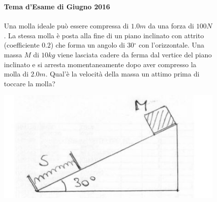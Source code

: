 \begin{figure}[h!]
{{            }
        }                  
    \end{figure}
    
    \begin{figure}[h!]
    \textbf{Tema d'Esame di Giugno 2016}\\ \\
    Una molla ideale può essere compressa di $1.0 m$ da una forza di $100 N$. La stessa molla è posta alla fine di un piano inclinato con attrito (coefficiente $0.2$) che forma un angolo di 30$^{\circ}$ con l'orizzontale. Una massa $M$ di $10 kg$ viene lasciata cadere da ferma dal vertice del piano inclinato e si arresta momentaneamente dopo aver compresso la molla di $2.0 m$. Qual'è la velocità della massa un attimo prima di toccare la molla? 
    \\
        \begin{center}
            \includegraphics[scale=0.5]{ES2/GIU022016.jpg}
        \end{center}


\end{figure}
